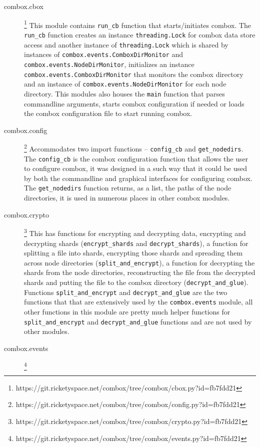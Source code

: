 \begin{description}
\item[combox.cbox]
  \footnote{https://git.ricketyspace.net/combox/tree/combox/cbox.py?id=fb7fdd21}
  This module contains \verb+run_cb+ function that starts/initiates
  combox. The \verb+run_cb+ function creates an instance
  \verb+threading.Lock+ for combox data store access and another
  instance of \verb+threading.Lock+ which is shared by instances of
  \verb+combox.events.ComboxDirMonitor+ and
  \verb+combox.events.NodeDirMonitor+, initializes an instance
  \verb+combox.events.ComboxDirMonitor+ that monitors the combox
  directory and an instance of \verb+combox.events.NodeDirMonitor+ for
  each node directory. This modules also houses the \verb+main+
  function that parses commandline arguments, starts combox
  configuration if needed or loads the combox configuration file to
  start running combox.
\item[combox.config]
  \footnote{https://git.ricketyspace.net/combox/tree/combox/config.py?id=fb7fdd21}
  Accommodates two import functions -- \verb+config_cb+ and
  \verb+get_nodedirs+. The \verb+config_cb+ is the combox
  configuration function that allows the user to configure combox, it
  was designed in a such way that it could be used by both the
  commandline and graphical interfaces for configuring combox. The
  \verb+get_nodedirs+ function returns, as a list, the paths of the
  node directories, it is used in numerous places in other combox
  modules.
\item[combox.crypto]
  \footnote{https://git.ricketyspace.net/combox/tree/combox/crypto.py?id=fb7fdd21}
  This has functions for encrypting and decrypting data, encrypting
  and decrypting shards (\verb+encrypt_shards+ and
  \verb+decrypt_shards+), a function for splitting a file into shards,
  encrypting those shards and spreading them across node directories
  (\verb+split_and_encrypt+), a function for decrypting the shards
  from the node directories, reconstructing the file from the
  decrypted shards and putting the file to the combox directory
  (\verb+decrypt_and_glue+). Functions \verb+split_and_encrypt+ and
  \verb+decrypt_and_glue+ are the two functions that that are
  extensively used by the \verb+combox.events+ module, all other
  functions in this module are pretty much helper functions for
  \verb+split_and_encrypt+ and \verb+decrypt_and_glue+ functions and
  are not used by other modules.
\item[combox.events]
  \footnote{https://git.ricketyspace.net/combox/tree/combox/events.py?id=fb7fdd21}

\end{description}
